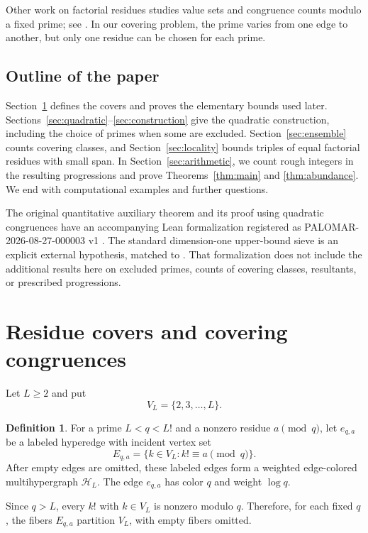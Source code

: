 \documentclass[11pt]{amsart}
\theoremstyle{definition}
\newtheorem{definition}[theorem]{Definition}
\theoremstyle{remark}
\begin{document}
Other work on factorial residues studies value sets and congruence
counts modulo a fixed prime; see
\cite{BanksLucaShparlinskiStichtenoth,GaraevLucaShparlinski,KlurmanMunsch,Hu}.
In our covering problem, the prime varies from one edge to another, but
only one residue can be chosen for each prime.

\subsection*{Outline of the paper}
Section~\ref{sec:hypergraph} defines the covers and proves the elementary
bounds used later. Sections~\ref{sec:quadratic}--\ref{sec:construction}
give the quadratic construction, including the choice of primes when
some are excluded. Section~\ref{sec:ensemble} counts covering classes,
and Section~\ref{sec:locality} bounds triples of equal factorial
residues with small span. In Section~\ref{sec:arithmetic}, we count
rough integers in the resulting progressions and prove
Theorems~\ref{thm:main} and \ref{thm:abundance}. We end with
computational examples and further questions.

The original quantitative auxiliary theorem and its proof using
quadratic congruences have an accompanying Lean formalization registered as
PALOMAR-2026-08-27-000003 v1 \cite{Palomar}. The standard dimension-one
upper-bound sieve is an explicit external hypothesis, matched to
\cite[Theorem~18.11(a)]{Koukoulopoulos}. That formalization does not
include the additional results here on excluded primes, counts of
covering classes, resultants, or prescribed progressions.

\section{Residue covers and covering congruences}\label{sec:hypergraph}

Let $L\geq2$ and put
\[
V_L=\{2,3,\ldots,L\}.
\]

\begin{definition}\label{def:fibres}
For a prime $L<q<L!$ and a nonzero residue $a\pmod q$, let $e_{q,a}$ be a
labeled hyperedge with incident vertex set
\[
E_{q,a}=\{k\in V_L:k!\equiv a\pmod q\}.
\]
After empty edges are omitted, these labeled edges form a weighted
edge-colored multihypergraph $\mathcal H_L$.  The edge $e_{q,a}$ has color
$q$ and weight $\log q$.
\end{definition}

Since $q>L$, every $k!$ with $k\in V_L$ is nonzero modulo $q$.  Therefore,
for each fixed $q$, the fibers $E_{q,a}$ partition $V_L$, with empty fibers
omitted.
\end{document}
